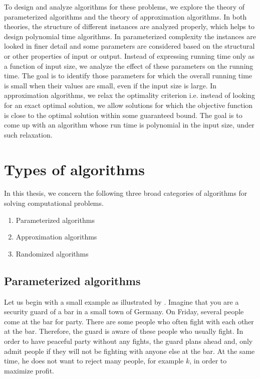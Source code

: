To design and analyze algorithms for these problems, we explore the theory of parameterized algorithms and the theory of approximation algorithms.
In both theories, the structure of different instances are analyzed properly, which helps to design polynomial time algorithms.
In parameterized complexity the instances are looked in finer detail and some parameters are considered based on the structural or other properties of input or output.
Instead of expressing running time only as a function
of input size, we analyze the effect of these parameters on the running time. 
The goal is to identify those parameters for which the overall running time is small when their values are small, even if the input size is large. 
In approximation algorithms, we relax the optimality criterion i.e. instead of looking for an exact optimal solution,
we allow solutions for which the objective function is close to the optimal solution within some guaranteed bound. 
The goal is to come up with an algorithm whose run time is polynomial in the input size, under such relaxation. 

\section{Types of algorithms}
In this thesis, we concern the following three broad categories of algorithms for solving computational problems.
\begin{enumerate}
 \item Parameterized algorithms
 \item Approximation algorithms 
 \item Randomized algorithms
\end{enumerate}

\subsection{Parameterized algorithms}
Let us begin with a small example as illustrated by \cite{cygan2015parameterized}. 
Imagine that you are a security guard of a bar
in a small town of Germany. On Friday, several people come at the bar for party. 
There are some people who often fight with each other at the bar. Therefore, the guard is aware of these people who usually fight.
In order to have peaceful party without any fights, the guard plans ahead and,
only admit people if they will not be fighting with anyone else at the
bar. At the same time, he does not want to reject many people, for example $k$, in order to maximize profit.

